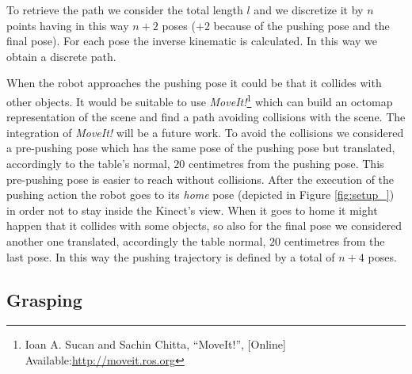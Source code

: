 To retrieve the path we consider the total length $l$ and we discretize it by $n$ points having in this way $n+2$ poses ($+2$ because of the pushing pose and the final pose). For each pose the inverse kinematic is calculated. In this way we obtain a discrete path. 

When the robot approaches the pushing pose it could be that it collides with other objects. It would be suitable to use \textit{MoveIt!}\footnote{Ioan A. Sucan and Sachin Chitta, “MoveIt!”, [Online] Available:\href{http://moveit.ros.org} {\url{http://moveit.ros.org}}} which can build an octomap representation of the scene and find a path avoiding collisions with the scene. The integration of \textit{MoveIt!} will be a future work. To avoid the collisions we considered a pre-pushing pose which has the same pose of the pushing pose but translated, accordingly to the table's normal, $20$ centimetres from the pushing pose. This pre-pushing pose is easier to reach without collisions. 
After the execution of the pushing action the robot goes to its \textit{home} pose (depicted in Figure \ref{fig:setup_}) in order not to stay inside the Kinect's view. When it goes to home it might happen that it collides with some objects, so also for the final pose we considered another one translated, accordingly the table normal, $20$ centimetres from the last pose. 
In this way the pushing trajectory is defined by a total of $n+4$ poses. 




\subsection{Grasping}
\label{sec:grasping}

